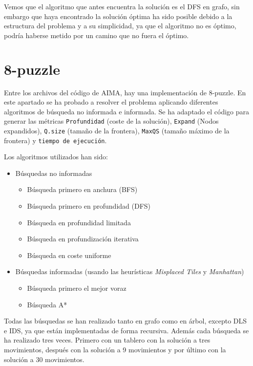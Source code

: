 \documentclass{article}
\begin{document}
Vemos que el algoritmo que antes encuentra la solución es el DFS en grafo, sin embargo que haya encontrado la solución óptima ha sido posible debido a la estructura del problema y a su simplicidad, ya que el algoritmo no es óptimo, podría haberse metido por un camino que no fuera el óptimo.

\section{8-puzzle}
Entre los archivos del código de AIMA, hay una implementación de 8-puzzle. En este apartado se ha probado a resolver el problema aplicando diferentes algoritmos de búsqueda no informada e informada. Se ha adaptado el código para generar las métricas \texttt{Profundidad} (coste de la solución), \texttt{Expand} (Nodos expandidos), \texttt{Q.size} (tamaño de la frontera), \texttt{MaxQS} (tamaño máximo de la frontera) y \texttt{tiempo de ejecución}.

Los algoritmos utilizados han sido:
\begin{itemize}
      \item Búsquedas no informadas
      \begin{itemize}
      \item Búsqueda primero en anchura (BFS)
      \item Búsqueda primero en profundidad (DFS)
      \item Búsqueda en profundidad limitada
      \item Búsqueda en profundización iterativa
      \item Búsqueda en coste uniforme
      \end{itemize}
      \item Búsquedas informadas (usando las heurísticas \textit{Misplaced Tiles} y \textit{Manhattan})
      \begin{itemize}
            \item Búsqueda primero el mejor voraz
            \item Búsqueda A* 
      \end{itemize}
\end{itemize}

Todas las búsquedas se han realizado tanto en grafo como en árbol, excepto DLS e IDS, ya que están implementadas de forma recursiva. Además cada búsqueda se ha realizado tres veces. Primero con un tablero con la solución a tres movimientos, después con la solución a 9 movimientos y por último con la solución a 30 movimientos.
\end{document}
